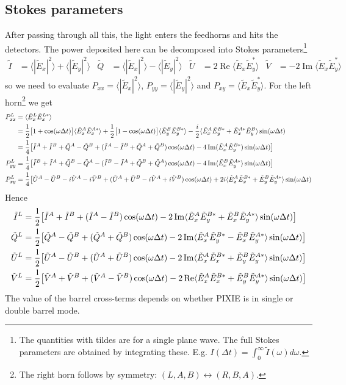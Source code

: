 \documentclass{article}
\renewcommand{\Re}{\operatorname{Re}}
\renewcommand{\Im}{\operatorname{Im}}
\newcommand{\I}{\tilde I}
\newcommand{\Q}{\tilde Q}
\newcommand{\U}{\tilde U}
\newcommand{\V}{\tilde V}
\newcommand{\J}{{\tilde E}}
\begin{document}
\subsection{Stokes parameters}
\label{s:stokes}
After passing through all this, the light enters the feedhorns and
hits the detectors. The power deposited here can be decomposed into
Stokes parameters\footnote{The quantities with tildes are for a single plane wave.
The full Stokes parameters are obtained by integrating these. E.g. $I(\Delta t) =
	\int_0^\infty \I(\omega) d\omega$.}
\begin{align}
	\I &= \langle |\J_x|^2\rangle + \langle|\J_y|^2\rangle &
	\Q &= \langle |\J_x|^2\rangle - \langle|\J_y|^2\rangle &
	\U &= 2\Re\langle \J_x\J_y^*\rangle &
	\V &= -2\Im\langle \J_x\J_y^*\rangle
\end{align}
so we need to evaluate $P_{xx} = \langle |\J_x|^2\rangle$,
$P_{yy} = \langle |\J_y|^2\rangle$ and $P_{xy} = \langle \J_x\J_y^*\rangle$.
For the left horn\footnote{The right horn follows by symmetry: $(L,A,B)\leftrightarrow
(R,B,A)$.} we get
\begin{align}
	P^L_{xx} &= \langle \J^L_x\J^{L*}_x \rangle \notag \\
		&= \frac12\big[1+\cos(\omega\Delta t)\big]\langle\J^A_x\J^{A*}_x\rangle
		+ \frac12\big[1-\cos(\omega\Delta t)\big]\langle\J^B_y\J^{B*}_y\rangle
		- \frac{i}2\langle\J^A_x\J^{B*}_y + \J^{A*}_x\J^B_y\rangle\sin(\omega\Delta t) \notag \\
		&= \frac14\big[\I^A+\I^B+\Q^A-\Q^B + (\I^A-\I^B+\Q^A+\Q^B)\cos(\omega\Delta t) -
		4\Im(\J^A_x\J^{B*}_y)\sin(\omega\Delta t) \big] \\
	P^L_{yy} &= \frac14\big[\I^B+\I^A+\Q^B-\Q^A - (\I^B-\I^A+\Q^B+\Q^A)\cos(\omega\Delta t) -
		4\Im\langle\J^B_x\J^{A*}_y\rangle\sin(\omega\Delta t) \big ]\\
	P^L_{xy} &= \frac14\big[\U^A-\U^B - i\V^A-i\V^B + (\U^A+\U^B -i\V^A+i\V^B)\cos(\omega\Delta t)
		+2i\langle\J^A_x\J^{B*}_x+\J^B_y\J^{A*}_y\rangle\sin(\omega\Delta t)
\end{align}
Hence
\begin{align}
	\I^L &= \frac12\big[\I^A+\I^B+(\I^A-\I^B)\cos(\omega\Delta t)
		-2\Im\langle\J^A_x\J^{B*}_y+\J^B_x\J^{A*}_y\rangle\sin(\omega\Delta t) \big] \notag \\
	\Q^L &= \frac12\big[\Q^A-\Q^B+(\Q^A+\Q^B)\cos(\omega\Delta t)
		-2\Im\langle\J^A_x\J^{B*}_y-\J^B_x\J^{A*}_y\rangle\sin(\omega\Delta t) \big] \notag \\
	\U^L &= \frac12\big[\U^A-\U^B+(\U^A+\U^B)\cos(\omega\Delta t)
		-2\Im\langle\J^A_x\J^{B*}_x+\J^B_y\J^{A*}_y\rangle\sin(\omega\Delta t) \big] \notag \\
	\V^L &= \frac12\big[\V^A+\V^B+(\V^A-\V^B)\cos(\omega\Delta t)
		-2\Re\langle\J^A_x\J^{B*}_x+\J^B_y\J^{A*}_y\rangle\sin(\omega\Delta t) \big]
\end{align}
The value of the barrel cross-terms depends on whether PIXIE is in single
or double barrel mode.
\end{document}
